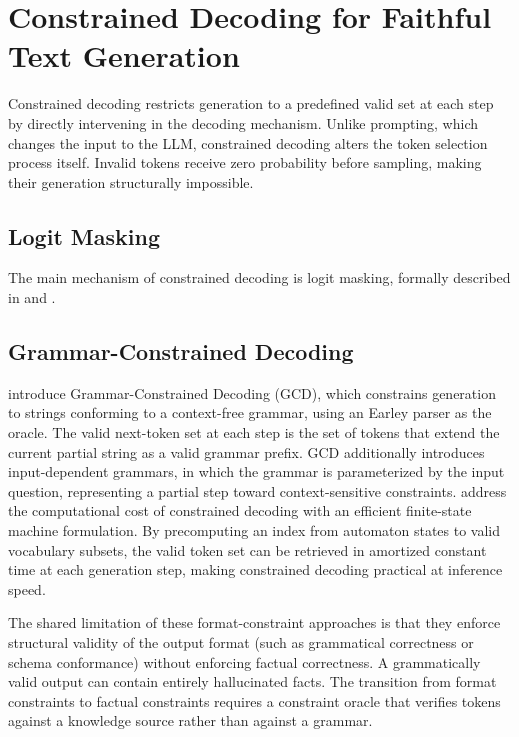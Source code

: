 \section{Constrained Decoding for Faithful Text Generation}
\label{sec:constrained}

Constrained decoding restricts generation to a predefined valid set at each step by directly intervening in the decoding mechanism. Unlike prompting, which changes the input to the LLM, constrained decoding alters the token selection process itself. Invalid tokens receive zero probability before sampling, making their generation structurally impossible.

\subsection{Logit Masking}

The main mechanism of constrained decoding is logit masking, formally described in \citet{geng2023grammarconstrained} and \citet{willard2023outlines}.

\subsection{Grammar-Constrained Decoding}

\citet{geng2023grammarconstrained} introduce Grammar-Constrained Decoding (GCD), which constrains generation to strings conforming to a context-free grammar, using an Earley parser as the oracle. The valid next-token set at each step is the set of tokens that extend the current partial string as a valid grammar prefix. GCD additionally introduces input-dependent grammars, in which the grammar is parameterized by the input question, representing a partial step toward context-sensitive constraints. \citet{willard2023outlines} address the computational cost of constrained decoding with an efficient finite-state machine formulation. By precomputing an index from automaton states to valid vocabulary subsets, the valid token set can be retrieved in amortized constant time at each generation step, making constrained decoding practical at inference speed.

The shared limitation of these format-constraint approaches is that they enforce structural validity of the output format (such as grammatical correctness or schema conformance) without enforcing factual correctness. A grammatically valid output can contain entirely hallucinated facts. The transition from format constraints to factual constraints requires a constraint oracle that verifies tokens against a knowledge source rather than against a grammar.

